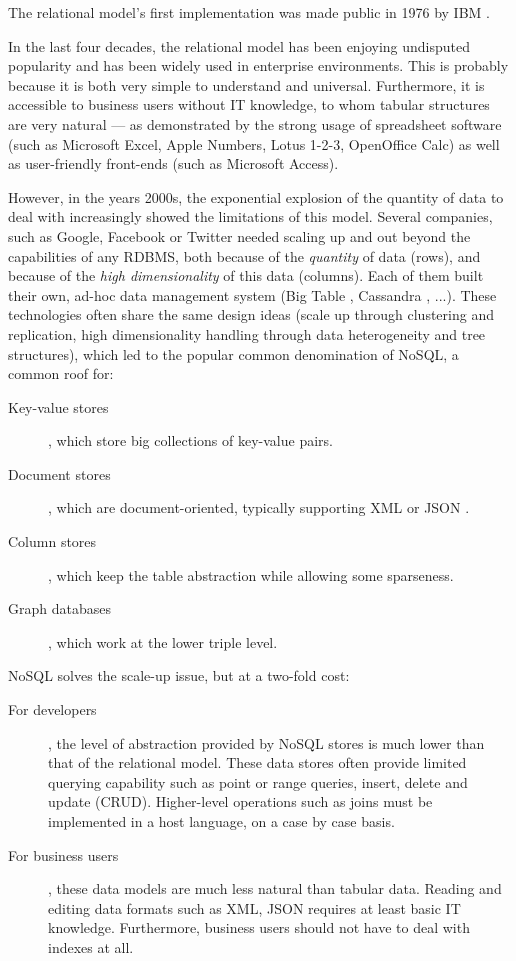 \documentclass{vldb}
\begin{document}
The relational model's first implementation was made public in 1976 by IBM \cite{Astrahan1976}.

In the last four decades, the relational model has been enjoying undisputed popularity and has been widely used in enterprise environments. This is probably because it is both very simple to understand and universal. Furthermore, it is accessible to business users without IT knowledge, to whom tabular structures are very natural --- as demonstrated by the strong usage of spreadsheet software \cite{Mattessich1958} \cite{Mattessich1961} (such as Microsoft Excel, Apple Numbers, Lotus 1-2-3, OpenOffice Calc) as well as user-friendly front-ends (such as Microsoft Access).

However, in the years 2000s, the exponential explosion of the quantity of data to deal with increasingly showed the limitations of this model. Several companies, such as Google, Facebook or Twitter needed scaling up and out beyond the capabilities of any RDBMS, both because of the \emph{quantity} of data (rows), and because of the \emph{high dimensionality} of this data (columns). Each of them built their own, ad-hoc data management system (Big Table \cite{Chang2008}, Cassandra \cite{Lakshman2010}, ...). These technologies often share the same design ideas (scale up through clustering and replication, high dimensionality handling through data heterogeneity and tree structures), which led to the popular common denomination of NoSQL, a common roof for:
\begin{description}
\item[Key-value stores], which store big collections of key-value pairs.
\item[Document stores], which are document-oriented, typically supporting XML \cite{XML} or JSON \cite{JSON}.
\item[Column stores], which keep the table abstraction while allowing some sparseness.
\item[Graph databases], which work at the lower triple level.
\end{description}

NoSQL solves the scale-up issue, but at a two-fold cost:
\begin{description}
\item[For developers], the level of abstraction provided by NoSQL stores is much lower than that of the relational model. These data stores often provide limited querying capability such as point or range queries, insert, delete and update (CRUD). Higher-level operations such as joins must be implemented in a host language, on a case by case basis.
\item[For business users], these data models are much less natural than tabular data. Reading and editing data formats such as XML, JSON requires at least basic IT knowledge. Furthermore, business users should not have to deal with indexes at all.
\end{description}
\end{document}
